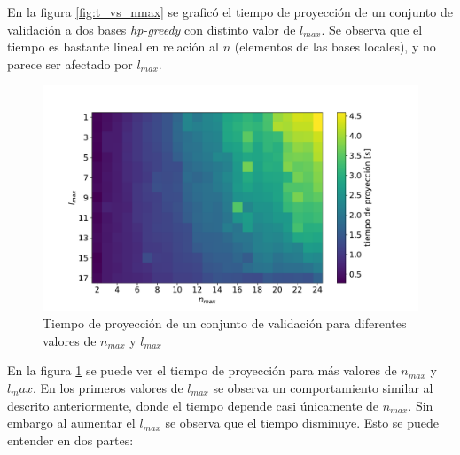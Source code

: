 En la figura \ref{fig:t_vs_nmax} se graficó el tiempo de proyección de un conjunto de validación a dos bases \textit{hp-greedy} con distinto valor de $l_{max}$. Se observa que el tiempo es bastante lineal en relación al $n$ (elementos de las bases locales), y no parece ser afectado por $l_{max}$.



\begin{figure}[h!]
\centering
\includegraphics[width=.9\columnwidth, trim={0, 1cm, 0, 1.4cm}]{figs/nmax_lmax_t_grid.pdf}
\caption{Tiempo de proyección de un conjunto de validación para diferentes valores de $n_{max}$ y $l_{max}$}
\label{fig:t_grilla_nl}
\end{figure}


En la figura \ref{fig:t_grilla_nl} se puede ver el tiempo de proyección para más valores de $n_{max}$ y ${l_max}$. En los primeros valores de $l_{max}$ se observa un comportamiento similar al descrito anteriormente, donde el tiempo depende casi únicamente de $n_{max}$. Sin embargo al aumentar el $l_{max}$ se observa que el tiempo disminuye. Esto se puede entender en dos partes:


